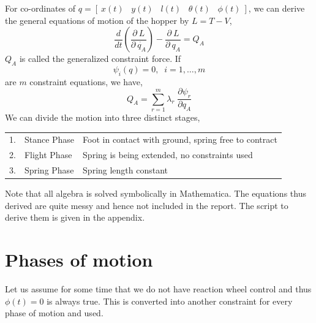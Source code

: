 For co-ordinates of $q = \left[\:x(t)\;\;\;y(t)\;\;\;l(t)\;\;\;\theta(t)\;\;\;\phi(t)\:\right]$, we can derive the general equations of motion of the hopper by $L = T - V$,
\begin{equation}
\frac{d}{dt}\left(\frac{\partial\:L}{\partial\:\dot{q_A}}\right) - \frac{\partial\:L}{\partial\:q_A} = Q_A
\end{equation}
$Q_A$ is called the generalized constraint force. If 
\begin{equation}
 \psi_i(q) = 0,\;\; i = 1,\dots, m
\end{equation}
are $m$ constraint equations, we have,
\begin{equation}
 Q_A = \sum_{r=1}^m\lambda_r\;\frac{\partial \psi_r}{\partial q_A}
\end{equation}
We can divide the motion into three distinct stages,
\begin{center}
\vspace{0.2in}
\begin{tabular}{l p{4cm} @{ : } p{9cm}}
1. & Stance Phase & Foot in contact with ground, spring free to contract\\
2. & Flight Phase & Spring is being extended, no constraints used\\
3. & Spring Phase & Spring length constant
\end{tabular}
\vspace{0.2in}
\end{center}
Note that all algebra is solved symbolically in Mathematica. The equations thus derived are quite messy and hence not included in the report. The script to derive them is given in the appendix.
\section{Phases of motion}
Let us assume for some time that we do not have reaction wheel control and thus $\phi(t) = 0$ is always true. This is converted into another constraint for every phase of motion and used.
